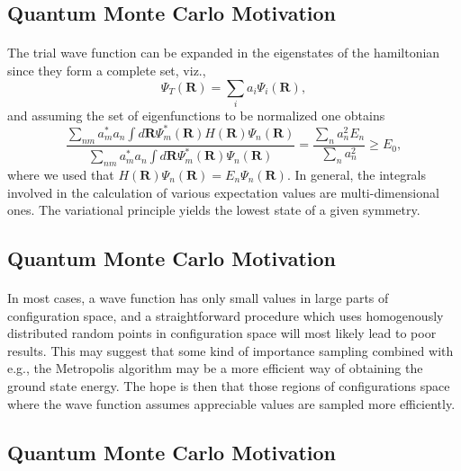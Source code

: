 \documentclass[%
twoside,                 %
final,                   %
10pt]{article}
\begin{document}
\subsection*{Quantum Monte Carlo Motivation}

\paragraph{}
The trial wave function can be expanded in the eigenstates of the hamiltonian since they form a complete set, viz.,
\[
   \Psi_T(\bm{R})=\sum_i a_i\Psi_i(\bm{R}),
\]
and assuming the set of eigenfunctions to be normalized one obtains 
\[
     \frac{\sum_{nm}a^*_ma_n \int d\bm{R}\Psi^{\ast}_m(\bm{R})H(\bm{R})\Psi_n(\bm{R})}
        {\sum_{nm}a^*_ma_n \int d\bm{R}\Psi^{\ast}_m(\bm{R})\Psi_n(\bm{R})} =\frac{\sum_{n}a^2_n E_n}
        {\sum_{n}a^2_n} \ge E_0,
\]
where we used that $H(\bm{R})\Psi_n(\bm{R})=E_n\Psi_n(\bm{R})$.
In general, the integrals involved in the calculation of various  expectation
values  are multi-dimensional ones. 
The variational principle yields the lowest state of a given symmetry.




\subsection*{Quantum Monte Carlo Motivation}

\paragraph{}
In most cases, a wave function has only small values in large parts of 
configuration space, and a straightforward procedure which uses
homogenously distributed random points in configuration space 
will most likely lead to poor results. This may suggest that some kind
of importance sampling combined with e.g., the Metropolis algorithm 
may be  a more efficient way of obtaining the ground state energy.
The hope is then that those regions of configurations space where
the wave function assumes appreciable values are sampled more 
efficiently.




\subsection*{Quantum Monte Carlo Motivation}
\end{document}
